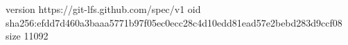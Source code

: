 version https://git-lfs.github.com/spec/v1
oid sha256:efdd7d460a3baaa5771b97f05ec0ecc28c4d10edd81ead57e2bebd283d9ccf08
size 11092

